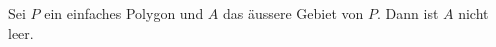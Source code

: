 \begin{lemma}
        Sei $P$ ein einfaches Polygon und $A$ das äussere Gebiet von $P$. 
        Dann ist $A$ nicht leer.
\end{lemma}